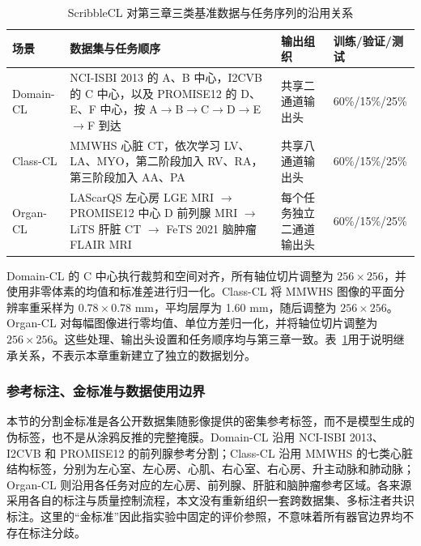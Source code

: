 \begin{table}[htbp]
\centering
\caption{ScribbleCL 对第三章三类基准数据与任务序列的沿用关系}
\label{tab:scribblecl-datasets}
\thesistablefont
\renewcommand{\arraystretch}{1.16}
\setlength{\tabcolsep}{3pt}
\begin{tabularx}{\textwidth}{@{}p{1.85cm}Xp{2.5cm}p{2.7cm}@{}}
\toprule
场景 & 数据集与任务顺序 & 输出组织 & 训练/验证/测试 \\
\midrule
Domain-CL &
NCI-ISBI 2013 的 A、B 中心，I2CVB 的 C 中心，以及 PROMISE12 的 D、E、F 中心，按 A$\rightarrow$B$\rightarrow$C$\rightarrow$D$\rightarrow$E$\rightarrow$F 到达 &
共享二通道输出头 &
60\%/15\%/25\% \\
\addlinespace
Class-CL &
MMWHS 心脏 CT，依次学习 LV、LA、MYO，第二阶段加入 RV、RA，第三阶段加入 AA、PA &
共享八通道输出头 &
60\%/15\%/25\% \\
\addlinespace
Organ-CL &
LAScarQS 左心房 LGE MRI $\rightarrow$ PROMISE12 中心 D 前列腺 MRI $\rightarrow$ LiTS 肝脏 CT $\rightarrow$ FeTS 2021 脑肿瘤 FLAIR MRI &
每个任务独立二通道输出头 &
60\%/15\%/25\% \\
\bottomrule
\end{tabularx}
\end{table}

Domain-CL 的 C 中心执行裁剪和空间对齐，所有轴位切片调整为 $256\times256$，并使用非零体素的均值和标准差进行归一化。Class-CL 将 MMWHS 图像的平面分辨率重采样为 $0.78\times0.78$ mm，平均层厚为 1.60 mm，随后调整为 $256\times256$。Organ-CL 对每幅图像进行零均值、单位方差归一化，并将轴位切片调整为 $256\times256$。这些处理、输出头设置和任务顺序均与第三章一致。表~\ref{tab:scribblecl-datasets}用于说明继承关系，不表示本章重新建立了独立的数据划分。

\subsubsection{参考标注、金标准与数据使用边界}
\label{subsubsec:scribblecl-reference-standard}

本节的分割金标准是各公开数据集随影像提供的密集参考标签，而不是模型生成的伪标签，也不是从涂鸦反推的完整掩膜。Domain-CL 沿用 NCI-ISBI 2013、I2CVB 和 PROMISE12 的前列腺参考分割\cite{dataset_prostate2,dataset_prostate,dataset_prostate3}；Class-CL 沿用 MMWHS 的七类心脏结构标签，分别为左心室、左心房、心肌、右心室、右心房、升主动脉和肺动脉\cite{care25ASA1,discussion_inter_seg3,care25ASA2}；Organ-CL 则沿用各任务对应的左心房、前列腺、肝脏和脑肿瘤参考区域。各来源采用各自的标注与质量控制流程，本文没有重新组织一套跨数据集、多标注者共识标注。这里的“金标准”因此指实验中固定的评价参照，不意味着所有器官边界均不存在标注分歧。

